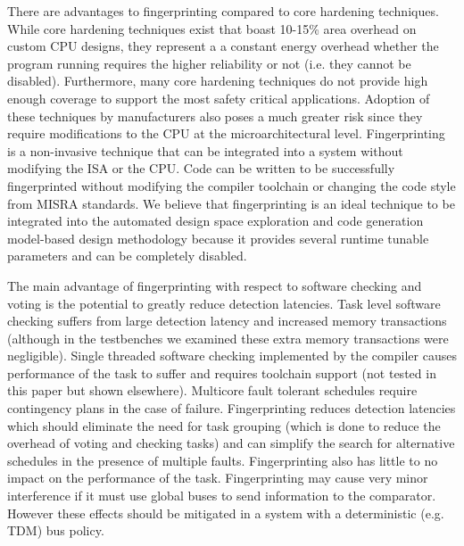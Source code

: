 	There are advantages to fingerprinting compared to core hardening techniques. While core hardening techniques exist that boast 10-15\% area overhead on custom CPU designs, they represent a a constant energy overhead whether the program running requires the higher reliability or not (i.e. they cannot be disabled). Furthermore, many core hardening techniques do not provide high enough coverage to support the most safety critical applications. Adoption of these techniques by manufacturers also poses a much greater risk since they require modifications to the CPU at the microarchitectural level. Fingerprinting is a non-invasive technique that can be integrated into a system without modifying the ISA or the CPU. Code can be written to be successfully fingerprinted without modifying the compiler toolchain or changing the code style from MISRA standards. We believe that fingerprinting is an ideal technique to be integrated into the automated design space exploration and code generation model-based design methodology because it provides several runtime tunable parameters and can be completely disabled.
	
	The main advantage of fingerprinting with respect to software checking and voting is the potential to greatly reduce detection latencies. Task level software checking suffers from large detection latency and increased memory transactions (although in the testbenches we examined these extra memory transactions were negligible). Single threaded software checking implemented by the compiler causes performance of the task to suffer and requires toolchain support (not tested in this paper but shown elsewhere). Multicore fault tolerant schedules require contingency plans in the case of failure. Fingerprinting reduces detection latencies which should eliminate the need for task grouping (which is done to reduce the overhead of voting and checking tasks) and can simplify the search for alternative schedules in the presence of multiple faults. Fingerprinting also has little to no impact on the performance of the task. Fingerprinting may cause very minor interference if it must use global buses to send information to the comparator. However these effects should be mitigated in a system with a deterministic (e.g. TDM) bus policy.	 
	
	
